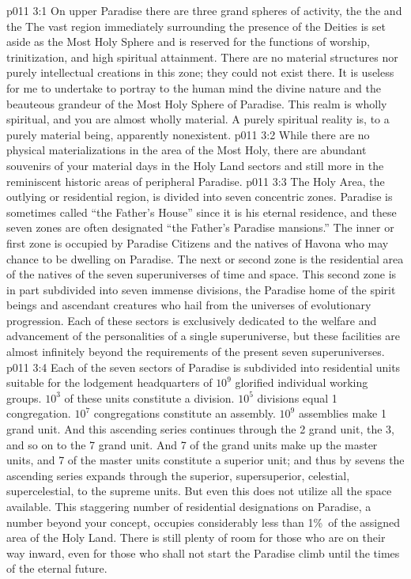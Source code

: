 \vs p011 3:1 On upper Paradise there are three grand spheres of activity, the  the  and the  The vast region immediately surrounding the presence of the Deities is set aside as the Most Holy Sphere and is reserved for the functions of worship, trinitization, and high spiritual attainment. There are no material structures nor purely intellectual creations in this zone; they could not exist there. It is useless for me to undertake to portray to the human mind the divine nature and the beauteous grandeur of the Most Holy Sphere of Paradise. This realm is wholly spiritual, and you are almost wholly material. A purely spiritual reality is, to a purely material being, apparently nonexistent.
\vs p011 3:2 While there are no physical materializations in the area of the Most Holy, there are abundant souvenirs of your material days in the Holy Land sectors and still more in the reminiscent historic areas of peripheral Paradise.
\vs p011 3:3 The Holy Area, the outlying or residential region, is divided into seven concentric zones. Paradise is sometimes called “the Father’s House” since it is his eternal residence, and these seven zones are often designated “the Father’s Paradise mansions.” The inner or first zone is occupied by Paradise Citizens and the natives of Havona who may chance to be dwelling on Paradise. The next or second zone is the residential area of the natives of the seven superuniverses of time and space. This second zone is in part subdivided into seven immense divisions, the Paradise home of the spirit beings and ascendant creatures who hail from the universes of evolutionary progression. Each of these sectors is exclusively dedicated to the welfare and advancement of the personalities of a single superuniverse, but these facilities are almost infinitely beyond the requirements of the present seven superuniverses.
\vs p011 3:4 Each of the seven sectors of Paradise is subdivided into residential units suitable for the lodgement headquarters of $10^9$ glorified individual working groups. $10^3$ of these units constitute a division. $10^5$ divisions equal 1 congregation. $10^7$ congregations constitute an assembly. $10^9$ assemblies make 1 grand unit. And this ascending series continues through the 2 grand unit, the 3, and so on to the 7 grand unit. And 7 of the grand units make up the master units, and 7 of the master units constitute a superior unit; and thus by sevens the ascending series expands through the superior, supersuperior, celestial, supercelestial, to the supreme units. But even this does not utilize all the space available. This staggering number of residential designations on Paradise, a number beyond your concept, occupies considerably less than 1\%\ of the assigned area of the Holy Land. There is still plenty of room for those who are on their way inward, even for those who shall not start the Paradise climb until the times of the eternal future.
